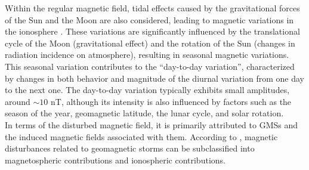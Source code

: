 \documentclass[12pt]{article}
\begin{document}
Within the regular magnetic field, tidal effects caused by the gravitational forces of the Sun and the Moon are also considered, leading to magnetic variations in the ionosphere \citep{BARTELS_kp}. These variations are significantly influenced by the translational cycle of the Moon (gravitational effect) and the rotation of the Sun (changes in radiation incidence on atmosphere), resulting in seasonal magnetic variations. This seasonal variation contributes to the ``day-to-day variation'', characterized by changes in both behavior and magnitude of the diurnal variation from one day to the next one. The day-to-day variation typically exhibits small amplitudes, around $ \sim 10 $ nT, although its intensity is also influenced by factors such as the season of the year, geomagnetic latitude, the lunar cycle, and solar rotation.\\


In terms of the disturbed magnetic field, it is primarily attributed to GMSs and the induced magnetic fields associated with them. According to \cite{ddyn2005}, magnetic disturbances related to geomagnetic storms can be subclassified into magnetospheric contributions and ionospheric contributions.\\
\end{document}
